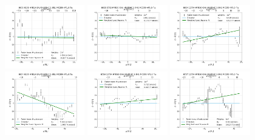 \begin{figure}
    \includegraphics[width=0.31\textwidth]{Images/WLSFITS/CC0/8602-6101.png}
    \includegraphics[width=0.31\textwidth]{Images/WLSFITS/CC0/8623-3702.png}
    \includegraphics[width=0.31\textwidth]{Images/WLSFITS/CC0/8624-12704.png}
    \includegraphics[width=0.31\textwidth]{Images/WLSFITS/CC0/8624-6103.png}
    \includegraphics[width=0.31\textwidth]{Images/WLSFITS/CC0/8716-12704.png}
    \includegraphics[width=0.31\textwidth]{Images/WLSFITS/CC0/8727-12704.png}

\end{figure}
